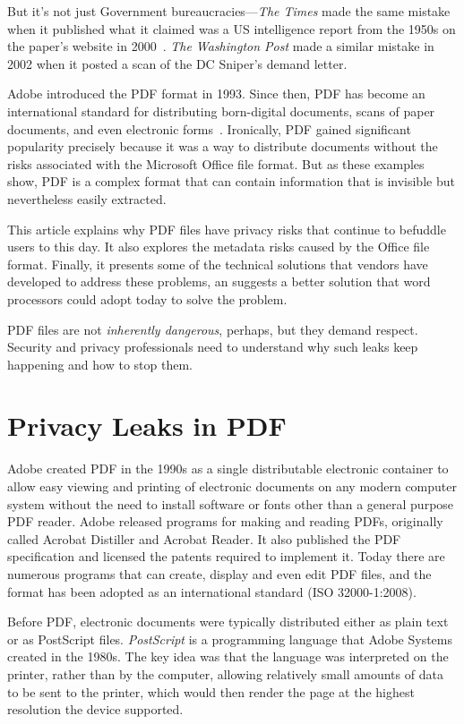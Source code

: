 
But it's not just Government bureaucracies---\emph{The Times}  made the
same mistake when it published what it claimed was a US intelligence
report from the 1950s on the paper's
website in 2000~\cite{nyt-unediting-2003}. \emph{The Washington Post}
  made a similar mistake in 2002 when it posted a scan of the DC
  Sniper's demand letter\cite{internet-forensics}.

Adobe introduced the PDF format in 1993. Since then, PDF has become an
international standard for distributing born-digital documents, scans
of paper documents, and even electronic
forms~\cite{ISO32000-1:2008}. Ironically, PDF gained significant
popularity precisely because it was a way to distribute documents
without the risks associated with the Microsoft Office file
format. But as these examples show, PDF is a complex format that can
contain information that is invisible but nevertheless easily
extracted.

This article explains why PDF files have privacy risks that continue
to befuddle users to this day. It also explores the metadata risks
caused by the Office file format. Finally, it presents some of the
technical solutions that vendors have developed to address these
problems, an suggests a better solution that word processors could
adopt today to solve the problem.

PDF files are not \emph{inherently dangerous}, perhaps, but they
demand respect. Security and privacy professionals need to
understand why such leaks keep happening and how to stop them.

\section{Privacy Leaks in PDF}

Adobe created PDF in the 1990s as a single distributable electronic
container to allow easy viewing and printing of electronic documents
on any modern computer system without the need to install software or
fonts other than a general purpose PDF reader. Adobe released programs
for making and reading PDFs, originally called Acrobat Distiller and
Acrobat Reader. It also published the PDF specification and
licensed the patents required to implement it. Today there are
numerous programs that can create, display and even edit PDF files,
and the format has been adopted as an international standard (ISO
32000-1:2008).

Before PDF, electronic documents were typically distributed either as
plain text or as PostScript files. \emph{PostScript} is a programming
language that Adobe Systems created in the 1980s. The key idea was
that the language was interpreted on the printer, rather
than by the computer, allowing relatively small amounts of data to be
sent to the printer, which would then render the page at the highest
resolution the device supported.

